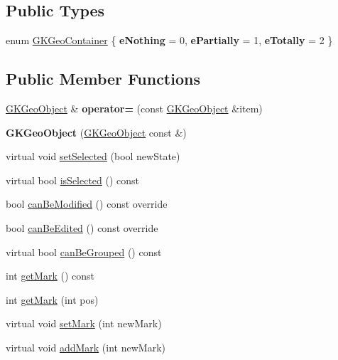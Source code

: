 \subsection*{Public Types}
\begin{DoxyCompactItemize}
\item 
enum \hyperlink{classGKGeoObject_ab07ccd042325dcfc9a4fce1f98e5ae51}{G\+K\+Geo\+Container} \{ {\bfseries e\+Nothing} = 0, 
{\bfseries e\+Partially} = 1, 
{\bfseries e\+Totally} = 2
 \}
\end{DoxyCompactItemize}
\subsection*{Public Member Functions}
\begin{DoxyCompactItemize}
\item 
\hyperlink{classGKGeoObject}{G\+K\+Geo\+Object} \& {\bfseries operator=} (const \hyperlink{classGKGeoObject}{G\+K\+Geo\+Object} \&item)\hypertarget{classGKGeoObject_a3ffa97f5309fa03289b2e4afb9660c5b}{}\label{classGKGeoObject_a3ffa97f5309fa03289b2e4afb9660c5b}

\item 
{\bfseries G\+K\+Geo\+Object} (\hyperlink{classGKGeoObject}{G\+K\+Geo\+Object} const \&)\hypertarget{classGKGeoObject_a31853fb805a0bb92dfc7714f21b9c3b4}{}\label{classGKGeoObject_a31853fb805a0bb92dfc7714f21b9c3b4}

\item 
virtual void \hyperlink{classGKGeoObject_a9016157ffeac73f0d89f8c5f309edba5}{set\+Selected} (bool new\+State)
\item 
virtual bool \hyperlink{classGKGeoObject_ad9e5fac3e4f56c153972beef5f433954}{is\+Selected} () const 
\item 
bool \hyperlink{classGKGeoObject_a19a4e8d78feb4d584c975acef1efb68d}{can\+Be\+Modified} () const override
\item 
bool \hyperlink{classGKGeoObject_a1f711271ae98d5eecb3a4cc4482a3110}{can\+Be\+Edited} () const override
\item 
virtual bool \hyperlink{classGKGeoObject_ab0e4aa17d4dc49aef5bc6110c1355e08}{can\+Be\+Grouped} () const 
\item 
int \hyperlink{classGKGeoObject_a8b18aa49cf7791d1f4d5ece6964aaf87}{get\+Mark} () const 
\item 
int \hyperlink{classGKGeoObject_a7d6f3701127ac947309993f1883c2f9f}{get\+Mark} (int pos)
\item 
virtual void \hyperlink{classGKGeoObject_aef22c197bc73c9282952b0d0308acabf}{set\+Mark} (int new\+Mark)
\item 
virtual void \hyperlink{classGKGeoObject_a083e57a14f1106112ccf467572695ae6}{add\+Mark} (int new\+Mark)\hypertarget{classGKGeoObject_a083e57a14f1106112ccf467572695ae6}{}\label{classGKGeoObject_a083e57a14f1106112ccf467572695ae6}


\end{DoxyCompactItemize}
